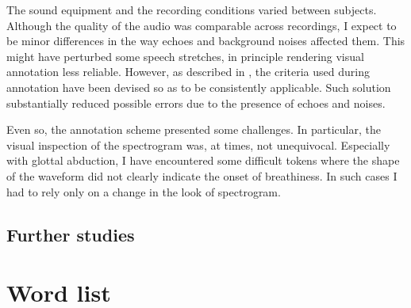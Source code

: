 \documentclass[11pt,a4paper,openany]{memoir}\usepackage[]{graphicx}\usepackage[]{color}
\begin{document}
The sound equipment and the recording conditions varied between subjects.
Although the quality of the audio was comparable across recordings, I expect to be minor differences in the way echoes and background noises affected them.
This might have perturbed some speech stretches, in principle rendering visual annotation less reliable.
However, as described in , the criteria used during annotation have been devised so as to be consistently applicable.
Such solution substantially reduced possible errors due to the presence of echoes and noises.

Even so, the annotation scheme presented some challenges.
In particular, the visual inspection of the spectrogram was, at times, not unequivocal.
Especially with glottal abduction, I have encountered some difficult tokens where the shape of the waveform did not clearly indicate the onset of breathiness.
In such cases I had to rely only on a change in the look of spectrogram.





\section{Further studies}







%





\appendix


\chapter{Word list}
\label{a:list}


\end{document}
